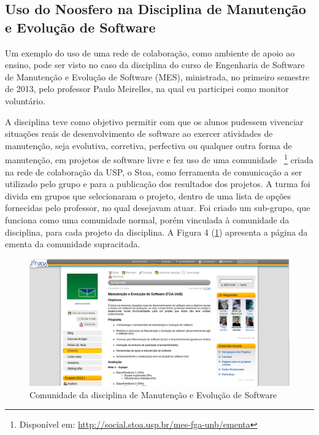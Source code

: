 
\subsection{Uso do Noosfero na Disciplina de Manutenção e Evolução de Software}
\label{mes-unb}

Um exemplo do uso de uma rede de colaboração, como ambiente de apoio ao ensino,
pode ser visto no caso da disciplina do curso de Engenharia de Software de
Manutenção e Evolução de Software (MES), ministrada, no primeiro semestre de
2013, pelo professor Paulo Meirelles, na qual eu participei como monitor
voluntário.

A disciplina teve como objetivo permitir com que os
alunos pudessem vivenciar situações reais de desenvolvimento de software ao
exercer atividades de manutenção, seja evolutiva, corretiva, perfectiva ou
qualquer outra forma de manutenção, em projetos de software livre e fez uso de
uma comunidade
~\footnote{Disponível em: \url{http://social.stoa.usp.br/mes-fga-unb/ementa}}
criada na rede de colaboração da USP, o Stoa, como ferramenta de comunicação a ser
utilizado pelo grupo e para a publicação dos resultados dos projetos.
%
A turma foi divida em grupos que selecionaram o projeto, dentro de uma lista
de opções fornecidas pelo professor, no qual desejavam atuar. Foi criado um 
sub-grupo, que funciona como uma comunidade normal, porém vinculada à comunidade
da disciplina, para cada projeto da disciplina. A Figura 4 (\ref{mes-unb})
apresenta a página da ementa da comunidade supracitada. 

\begin{figure}[h]
	\centering
	\label{mes-unb}
		\includegraphics[keepaspectratio=true,scale=0.3]
		{figuras/mes-unb.eps}
	\caption{Comunidade da disciplina de Manutenção e Evolução de Software}
\end{figure}

